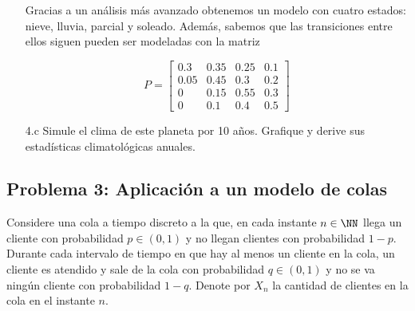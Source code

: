 \begin{enumerate}
    Gracias a un análisis más avanzado obtenemos un modelo con cuatro estados: nieve, lluvia, parcial y soleado. Además, sabemos que las transiciones entre ellos siguen pueden ser modeladas con la matriz

    $$ P = 
    \begin{bmatrix}
        0.3 & 0.35 & 0.25 & 0.1\\
        0.05 & 0.45 & 0.3 & 0.2\\
        0 & 0.15 & 0.55 & 0.3 \\
        0 & 0.1 & 0.4 & 0.5
    \end{bmatrix}$$
    \item[4.c] Simule el clima de este planeta por 10 años. Grafique y derive sus estadísticas climatológicas anuales.
\end{enumerate}

\subsection*{Problema 3: Aplicación a un modelo de colas}

Considere una cola a tiempo discreto a la que, en cada instante $n\in \NN$ llega un cliente con probabilidad $p\in (0,1)$ y no llegan clientes con probabilidad $1-p$. Durante cada intervalo de tiempo en que hay al menos un cliente en la cola, un cliente es atendido y sale de la cola con probabilidad $q\in (0,1)$ y no se va ningún cliente con probabilidad $1-q$. Denote por $X_n$ la cantidad de clientes en la cola en el instante $n$.

